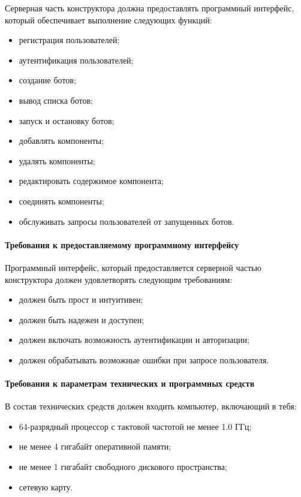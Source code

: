 Серверная часть конструктора должна предоставлять программный
интерфейс, который обеспечивает выполнение следующих функций:
\begin{itemize}
	\item регистрация пользователей;
	\item аутентификация пользователей;
	\item создание ботов;
	\item вывод списка ботов;
	\item запуск и остановку ботов;
	\item добавлять компоненты;
	\item удалять компоненты;
	\item редактировать содержимое компонента;
	\item соединять компоненты;
	\item обслуживать запросы пользователей от запущенных ботов.
\end{itemize}

\paragraph{Требования к предоставляемому программному интерфейсу}

Программный интерфейс, который предоставляется серверной частью
конструктора должен удовлетворять следующим требованиям:
\begin{itemize}
	\item должен быть прост и интуитивен;
	\item должен быть надежен и доступен;
	\item должен включать возможность аутентификации и авторизации;
	\item должен обрабатывать возможные ошибки при запросе
	      пользователя.
\end{itemize}

\paragraph{Требования к параметрам технических и программных средств}

В состав технических средств должен входить компьютер, включающий
в тебя:
\begin{itemize}
	\item 64-разрядный процессор с тактовой частотой не менее 1.0 ГГц;
	\item не менее 4 гигабайт оперативной памяти;
	\item не менее 1 гигабайт свободного дискового пространства;
	\item сетевую карту.
\end{itemize}

